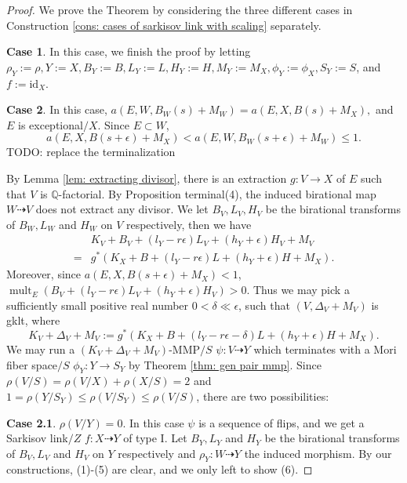 \documentclass[11pt]{amsart}
\numberwithin{equation}{section}
\newcommand{\id}{\mathrm{id}}
\newcommand{\Qq}{\mathbb{Q}}
\newcommand{\mult}{\operatorname{mult}}
\theoremstyle{definition}
\theoremstyle{definition}
\theoremstyle{definition}
\begin{document}
\begin{proof}

We prove the Theorem by considering the three different cases in Construction \ref{cons: cases of sarkisov link with scaling} separately.

\medskip

\noindent\textbf{Case 1}. In this case, we finish the proof by letting $\rho_Y:=\rho, Y:=X, B_Y:=B, L_Y:=L, H_Y:=H, M_Y:=M_X, \phi_Y:=\phi_X, S_Y:=S$, and $f:=\id_X$.

\medskip

\noindent\textbf{Case 2}. In this case, $a(E,W,B_W(s)+M_W)=a(E,X,B(s)+M_X),$ and $E$ is exceptional$/X$. Since $E\subset W$, $$a(E,X,B(s+\epsilon)+M_X)<a(E,W,B_W(s+\epsilon)+M_W)\leq 1.$$
 TODO: replace the terminalization 

By Lemma \ref{lem: extracting divisor}, there is an extraction $g: V\rightarrow X$ of $E$ such that $V$ is $\Qq$-factorial. By Proposition terminal(4), the induced birational map $W\dashrightarrow V$ does not extract any divisor. We let $B_V,L_V,H_V$ be the birational transforms of $B_W,L_W$ and $H_W$ on $V$ respectively, then we have
\begin{align*}
    &K_V+B_V+(l_Y-r\epsilon)L_V+(h_Y+\epsilon)H_V+M_V\\
    =&g^*(K_X+B+(l_Y-r\epsilon)L+(h_Y+\epsilon)H+M_X).
\end{align*}
Moreover, since $a(E,X,B(s+\epsilon)+M_X)<1$, $\mult_E(B_V+(l_Y-r\epsilon)L_V+(h_Y+\epsilon)H_V)>0$. Thus we may pick a sufficiently small positive real number $0<\delta\ll\epsilon$, such that 
$(V,\Delta_V+M_V)$ is gklt, where
$$K_V+\Delta_V+M_V:=g^*(K_X+B+(l_Y-r\epsilon-\delta)L+(h_Y+\epsilon)H+M_X).$$
We may run a $(K_V+\Delta_V+M_V)$-MMP$/S$ $\psi: V\dashrightarrow Y$ which terminates with a Mori fiber space$/S$ $\phi_Y: Y\rightarrow S_Y$ by Theorem \ref{thm: gen pair mmp}. Since $\rho(V/S)=\rho(V/X)+\rho(X/S)=2$ and $1=\rho(Y/S_Y)\leq\rho(V/S_Y)\leq\rho(V/S)$, there are two possibilities:

\medskip

\noindent\textbf{Case 2.1}. $\rho(V/Y)=0$. In this case $\psi$ is a sequence of flips, and we get a Sarkisov link$/Z$ $f:X\dashrightarrow Y$ of type I. Let $B_Y,L_Y$ and $H_Y$ be the birational transforms of $B_V,L_V$ and $H_V$ on $Y$ respectively and $\rho_Y: W\dashrightarrow Y$ the induced morphism. By our constructions, (1)-(5) are clear, and we only left to show (6).


\end{proof}
\end{document}
